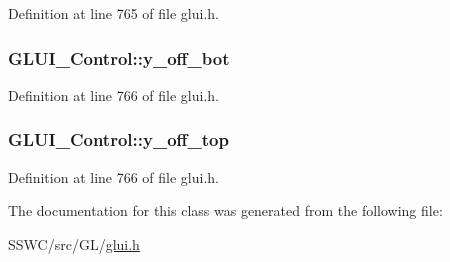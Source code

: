 Definition at line 765 of file glui.\+h.

\hypertarget{class_g_l_u_i___control_af4beca38aaf1aba7f5b4bfa3ccc8b909}{
\subsubsection[{y\+\_\+off\+\_\+bot}]{ G\+L\+U\+I\+\_\+\+Control\+::y\+\_\+off\+\_\+bot}}\label{class_g_l_u_i___control_af4beca38aaf1aba7f5b4bfa3ccc8b909}


Definition at line 766 of file glui.\+h.

\hypertarget{class_g_l_u_i___control_a94fec9974356d3955e3a80e7d06926b9}{
\subsubsection[{y\+\_\+off\+\_\+top}]{ G\+L\+U\+I\+\_\+\+Control\+::y\+\_\+off\+\_\+top}}\label{class_g_l_u_i___control_a94fec9974356d3955e3a80e7d06926b9}


Definition at line 766 of file glui.\+h.



The documentation for this class was generated from the following file\+:\begin{DoxyCompactItemize}
\item 
S\+S\+W\+C/src/\+G\+L/\hyperlink{glui_8h}{glui.\+h}\end{DoxyCompactItemize}
